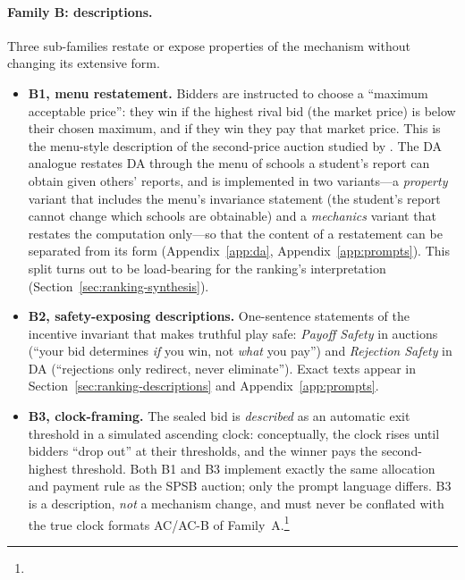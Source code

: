 \paragraph{Family B: descriptions.}
Three sub-families restate or expose properties of the mechanism without
changing its extensive form.
\begin{itemize}
    \item \textbf{B1, menu restatement.} Bidders are instructed to choose a
    ``maximum acceptable price'': they win if the highest rival bid (the market
    price) is below their chosen maximum, and if they win they pay that market
    price. This is the menu-style description of the second-price auction
    studied by \citet{gonczarowski2023strategyproofness}. The DA analogue
    restates DA through the menu of schools a student's report can obtain
    given others' reports, and is implemented in two variants---a
    \emph{property} variant that includes the menu's invariance statement (the
    student's report cannot change which schools are obtainable) and a
    \emph{mechanics} variant that restates the computation only---so that the
    content of a restatement can be separated from its form
    (Appendix~\ref{app:da}, Appendix~\ref{app:prompts}). This split turns out
    to be load-bearing for the ranking's interpretation
    (Section~\ref{sec:ranking-synthesis}).
    \item \textbf{B2, safety-exposing descriptions.} One-sentence statements of
    the incentive invariant that makes truthful play safe: \emph{Payoff Safety}
    in auctions (``your bid determines \emph{if} you win, not \emph{what} you
    pay'') and \emph{Rejection Safety} in DA (``rejections only redirect, never
    eliminate''). Exact texts appear in Section~\ref{sec:ranking-descriptions}
    and Appendix~\ref{app:prompts}.
    \item \textbf{B3, clock-framing.} The sealed bid is \emph{described} as an
    automatic exit threshold in a simulated ascending clock: conceptually, the
    clock rises until bidders ``drop out'' at their thresholds, and the winner
    pays the second-highest threshold. Both B1 and B3 implement exactly the
    same allocation and payment rule as the SPSB auction; only the prompt
    language differs. B3 is a description, \emph{not} a mechanism change, and
    must never be conflated with the true clock formats AC/AC-B of
    Family~A.\footnote{}
\end{itemize}

